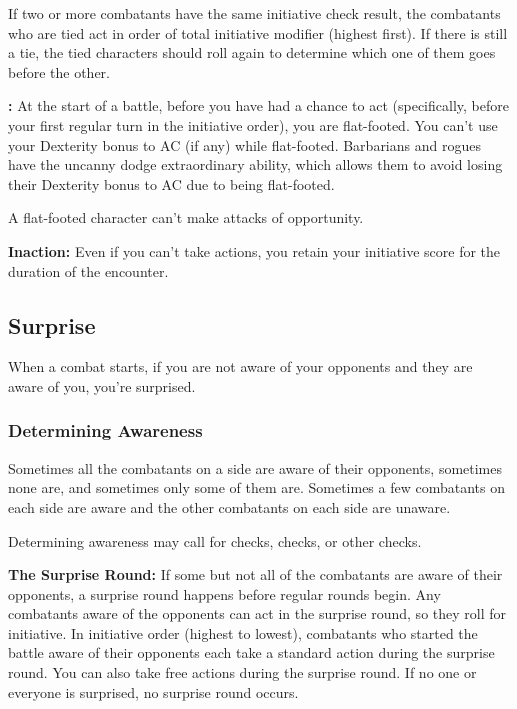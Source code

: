 If two or more combatants have the same initiative check result, the combatants 
who are tied act in order of total initiative modifier (highest first). If there 
is still a tie, the tied characters should roll again to determine which one of 
them goes before the other.

\textbf{:} At the start of a battle, before you have had a chance to 
act (specifically, before your first regular turn in the initiative order), you 
are flat-footed. You can't use your Dexterity bonus to AC (if any) while flat-footed. 
Barbarians and rogues have the uncanny dodge extraordinary ability, which allows 
them to avoid losing their Dexterity bonus to AC due to being flat-footed.

A flat-footed character can't make attacks of opportunity.

\textbf{Inaction:} Even if you can't take actions, you retain your initiative score 
for the duration of the encounter.

\subsection{Surprise}

When a combat starts, if you are not aware of your opponents and they are aware 
of you, you're surprised.

\subsubsection{Determining Awareness}

Sometimes all the combatants on a side are aware of their opponents, sometimes 
none are, and sometimes only some of them are. Sometimes a few combatants on each 
side are aware and the other combatants on each side are unaware.

Determining awareness may call for  checks,  checks, or other checks.

\textbf{The Surprise Round:} If some but not all of the combatants are aware of 
their opponents, a surprise round happens before regular rounds begin. Any combatants 
aware of the opponents can act in the surprise round, so they roll for initiative. 
In initiative order (highest to lowest), combatants who started the battle aware 
of their opponents each take a standard action during the surprise round. You can 
also take free actions during the surprise round. If no one or everyone is surprised, 
no surprise round occurs.


